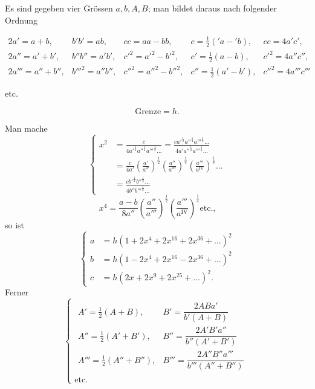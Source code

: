 \begingroup
\makeatletter\tagsleft@true\let\veqno\@@leqno\makeatother
\clearpage{}\NoSourceHead
{}
\noindent [S.\ 37]
\par\indent Es sind gegeben vier Grössen \(a,b,A,B\); man bildet daraus nach folgender Ordnung
{\small\setlength{\arraycolsep}{3pt}
\[\begin{array}{lllll}
2a'=a+b,&b'b'=ab,&cc=aa-bb,&c=\frac12({}'a-{}'b),&cc=4a'c',\\[.5em]
2a''=a'+b',&b''b''=a'b',&c'^{2}=a'^{2}-b'^{2},&c'=\frac12(a-b),&c'^{2}=4a''c'',\\[.5em]
2a'''=a''+b'',&b'''^{2}=a''b'',&c''^{2}=a''^{2}-b''^{2},&c''=\frac12(a'-b'),&c''^{2}=4a'''c'''
\end{array}\]
\begin{center}etc.\end{center}}
\[\text{Grenze}=h.\]
\par\indent Man mache
\begin{equation*}\tag*{[1]}
\left\{\begin{aligned}
x^2&=\frac{c}{4a'^{\frac12}a''^{\frac14}a'''^{\frac18}\ldots}
=\frac{ca'^{\frac12}a''^{\frac14}a'''^{\frac18}\ldots}{4a'a''^{\frac12}a'''^{\frac14}\ldots}\\[.8em]
&=\frac{c}{4a'}\left(\frac{a'}{a''}\right)^{\frac12}\left(\frac{a''}{a'''}\right)^{\frac14}\left(\frac{a'''}{a^{\mathrm{IV}}}\right)^{\frac18}\ldots\\[.8em]
&=\frac{cb'^{\frac12}b''^{\frac14}\ldots}{4b''b'''^{\frac12}\ldots}
\end{aligned}\right.
\end{equation*}
\[x^4=\frac{a-b}{8a''}\left(\frac{a''}{a'''}\right)^{\frac12}\left(\frac{a'''}{a^{\mathrm{IV}}}\right)^{\frac14}\text{etc.,}\]
\noindent so ist
\begin{equation*}\tag*{[2]}
\left\{\begin{aligned}
a&=h(1+2x^4+2x^{16}+2x^{36}+\ldots)^2\\
b&=h(1-2x^4+2x^{16}-2x^{36}+\ldots)^2\\
c&=h(2x+2x^9+2x^{25}+\ldots)^2.
\end{aligned}\right.
\end{equation*}
\clearpage{}
\noindent Ferner
\begin{equation*}\tag*{[3]}
\left\{\begin{gathered}
\begin{array}{ll}
A'=\frac12(A+B),& B'=\dfrac{2ABa'}{b'(A+B)}\\[.7em]
A''=\frac12(A'+B'),& B''=\dfrac{2A'B'a''}{b''(A'+B')}\\[.7em]
A'''=\frac12(A''+B''),& B'''=\dfrac{2A''B''a'''}{b'''(A''+B'')}
\end{array}\\
\text{etc.}
\end{gathered}\right.
\end{equation*}
